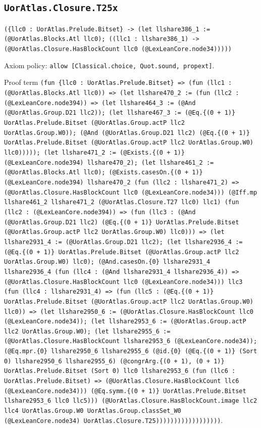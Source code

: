 \documentclass[11pt]{article}
\begin{document}
\subsection*{\texttt{UorAtlas.Closure.T25x}}
\noindent\texttt{(\{llc0 : UorAtlas.Prelude.Bitset\} -> (let llshare386\_1 := (@UorAtlas.Blocks.Atl llc0); ((llc1 : llshare386\_1) -> (@UorAtlas.Closure.HasBlockCount llc0 (@LexLeanCore.node34)))))}\par
\noindent Axiom policy: \texttt{allow [Classical.choice, Quot.sound, propext]}.\par
\noindent Proof term \texttt{(fun \{llc0 : UorAtlas.Prelude.Bitset\} => (fun (llc1 : (@UorAtlas.Blocks.Atl llc0)) => (let llshare470\_2 := (fun (llc2 : (@LexLeanCore.node394)) => (let llshare464\_3 := (@And (@UorAtlas.Group.D21 llc2)); (let llshare467\_3 := (@Eq.\{(0 + 1)\} UorAtlas.Prelude.Bitset (@UorAtlas.Group.actP llc2 UorAtlas.Group.W0)); (@And (@UorAtlas.Group.D21 llc2) (@Eq.\{(0 + 1)\} UorAtlas.Prelude.Bitset (@UorAtlas.Group.actP llc2 UorAtlas.Group.W0) llc0))))); (let llshare471\_2 := (@Exists.\{(0 + 1)\} (@LexLeanCore.node394) llshare470\_2); (let llshare461\_2 := (@UorAtlas.Blocks.Atl llc0); (@Exists.casesOn.\{(0 + 1)\} (@LexLeanCore.node394) llshare470\_2 (fun (llc2 : llshare471\_2) => (@UorAtlas.Closure.HasBlockCount llc0 (@LexLeanCore.node34))) (@Iff.mp llshare461\_2 llshare471\_2 (@UorAtlas.Closure.T27 llc0) llc1) (fun (llc2 : (@LexLeanCore.node394)) => (fun (llc3 : (@And (@UorAtlas.Group.D21 llc2) (@Eq.\{(0 + 1)\} UorAtlas.Prelude.Bitset (@UorAtlas.Group.actP llc2 UorAtlas.Group.W0) llc0))) => (let llshare2931\_4 := (@UorAtlas.Group.D21 llc2); (let llshare2936\_4 := (@Eq.\{(0 + 1)\} UorAtlas.Prelude.Bitset (@UorAtlas.Group.actP llc2 UorAtlas.Group.W0) llc0); (@And.casesOn.\{0\} llshare2931\_4 llshare2936\_4 (fun (llc4 : (@And llshare2931\_4 llshare2936\_4)) => (@UorAtlas.Closure.HasBlockCount llc0 (@LexLeanCore.node34))) llc3 (fun (llc4 : llshare2931\_4) => (fun (llc5 : (@Eq.\{(0 + 1)\} UorAtlas.Prelude.Bitset (@UorAtlas.Group.actP llc2 UorAtlas.Group.W0) llc0)) => (let llshare2950\_6 := (@UorAtlas.Closure.HasBlockCount llc0 (@LexLeanCore.node34)); (let llshare2953\_6 := (@UorAtlas.Group.actP llc2 UorAtlas.Group.W0); (let llshare2955\_6 := (@UorAtlas.Closure.HasBlockCount llshare2953\_6 (@LexLeanCore.node34)); (@Eq.mpr.\{0\} llshare2950\_6 llshare2955\_6 (@id.\{0\} (@Eq.\{(0 + 1)\} (Sort 0) llshare2950\_6 llshare2955\_6) (@congrArg.\{(0 + 1), (0 + 1)\} UorAtlas.Prelude.Bitset (Sort 0) llc0 llshare2953\_6 (fun (llc6 : UorAtlas.Prelude.Bitset) => (@UorAtlas.Closure.HasBlockCount llc6 (@LexLeanCore.node34))) (@Eq.symm.\{(0 + 1)\} UorAtlas.Prelude.Bitset llshare2953\_6 llc0 llc5))) (@UorAtlas.Closure.HasBlockCount.image llc2 llc4 UorAtlas.Group.W0 UorAtlas.Group.classSet\_W0 (@LexLeanCore.node34) UorAtlas.Closure.T25))))))))))))))))))}.\par
\end{document}
